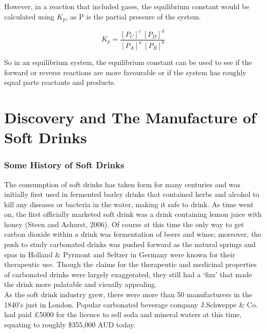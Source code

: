 However, in a reaction that included gases, the equilibrium constant would be calculated using \begin{math}K_{p}\end{math}, as P is the partial pressure of the system.

\begin{figure}[htp]
    \centering
    \[
        K_{p} = \frac{[P_{C}]^c \ [P_{D}]^d}{[P_{A}]^a \ [P_{B}]^b}
    \]
    \caption{}
    \label{fig:enter-label}
\end{figure}

So in an equilibrium system, the equilibrium constant can be used to see if the forward or reverse reactions are more favourable or if the system has roughly equal parts reactants and products.










\chapter{Discovery and The Manufacture of Soft Drinks}\label{ch3}

\subsection{Some History of Soft Drinks}
The consumption of soft drinks has taken form for many centuries and was initially first used in fermented barley drinks that contained herbs and alcohol to kill any diseases or bacteria in the water, making it safe to drink. As time went on, the first officially marketed soft drink was a drink containing lemon juice with honey (Steen and Ashurst, 2006). Of course at this time the only way to get carbon dioxide within a drink was fermentation of beers and wines; moreover, the push to study carbonated drinks was pushed forward as the natural springs and spas in Holland \& Pyrmont and Seltzer in Germany were known for their therapeutic use. Though the claims for the therapeutic and medicinal properties of carbonated drinks were largely exaggerated, they still had a ‘fizz’ that made the drink more palatable and visually appealing. \\

As the soft drink industry grew, there were more than 50 manufacturers in the 1840’s just in London. Popular carbonated beverage company J.Schweppe \& Co. had paid £5000 for the licence to sell soda and mineral waters at this time, equating to roughly \$355,000 AUD today. \\


